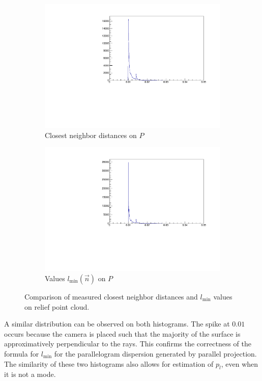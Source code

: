 \begin{figure}[H]
\centering
\begin{subfigure}{.5\textwidth}
	\includegraphics[width=\linewidth]{fig/nn.pdf}
	\caption{Closest neighbor distances on $P$}
\end{subfigure}%
\begin{subfigure}{.5\textwidth}
	\includegraphics[width=\linewidth]{fig/nn_lmin.pdf}
	\caption{Values $l_{\text{min}}(\vec{n})$ on $P$}
\end{subfigure}	
\caption{Comparison of measured closest neighbor distances and $l_\text{min}$ values on relief point cloud.}
\label{fig:relief_nn_hist}
\end{figure}

A similar distribution can be observed on both histograms. The spike at $0.01$ occurs because the camera is placed such that the majority of the surface is approximatively perpendicular to the rays. This confirms the correctness of the formula for $l_{\text{min}}$ for the parallelogram dispersion generated by parallel projection. The similarity of these two histograms also allows for estimation of $p_l$, even when it is not a mode.
 

